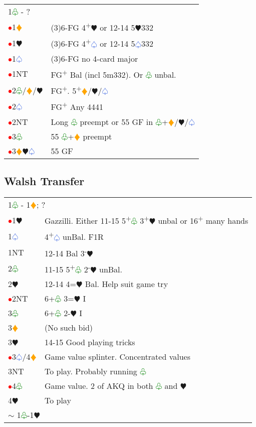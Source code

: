 \documentclass{article}
\renewcommand{\sp}{\textcolor{RoyalBlue}{$\varspade$}}
\newcommand{\he}{\textcolor{RubineRed}{$\varheart$}}
\newcommand{\di}{\textcolor{Orange}{$\vardiamond$}}
\newcommand{\cl}{\textcolor{Green}{$\varclub$}}
\newcommand{\nt}{\relsize{-1}NT\relsize{1}}
\newcommand{\up}{\textsuperscript{+}}
\newcommand{\down}{\textsuperscript{-}}
\newcommand{\al}{\textcolor{red}{$\bullet$}}
\begin{document}
\begin{tabular}{|l|p{6.5cm}}
	\multicolumn{2}{l}{1\cl{} - ? } \\
	\al{}1\di{} & (3)6-FG 4\up\he{} or 12-14 5\he{}332 \\
	\al{}1\he{} & (3)6-FG 4\up\sp{} or 12-14 5\sp{}332 \\
	\al{}1\sp{} & (3)6-FG no 4-card major \\
	\al{}1\nt & FG\up{} Bal (incl 5m332). Or \cl{} unbal. \\
	\al{}2\cl{}/\di{}/\he{} & FG\up{}. 5\up{}\di{}/\he{}/\sp{} \\
	\al{}2\sp{} & FG\up{} Any 4441 \\
	\al{}2\nt & Long \cl{} preempt or 55 GF in \cl{}+\di{}/\he{}/\sp{} \\
	\al{}3\cl{} & 55 \cl{}+\di{} preempt \\
	\al{}3\di{}\he{}\sp{} & 55 GF \\
\end{tabular}

\subsection{Walsh Transfer}
\begin{tabular}{|l|p{6.5cm}}
	\multicolumn{2}{l}{1\cl{} - 1\di{}; ?} \\
	\al{}1\he{} & Gazzilli. Either 11-15 5\up{}\cl{} 3\up{}\he{} unbal or 16\up{} many hands \\
		1\sp{} & 4\up\sp{} unBal. F1R \\
		1\nt & 12-14 Bal 3\down\he{}\\
		2\cl{} & 11-15 5\up\cl{} 2\down{}\he{} unBal.\\
		2\he{} & 12-14 4=\he{} Bal. Help suit game try \\
		\al{}2\nt & 6+\cl{} 3=\he{} I \\
		3\cl{} & 6+\cl{} 2-\he{} I \\
		3\di{} & (No such bid) \\
		3\he{} & 14-15 Good playing tricks \\
		\al{}3\sp{}/4\di{} & Game value splinter. Concentrated values \\
		3\nt{} & To play. Probably running \cl{} \\
		\al{}4\cl{} & Game value. 2 of AKQ in both \cl{} and \he{} \\
		4\he{} & To play \\ 
		\multicolumn{2}{l}{$\sim$ 1\cl{}-1\he{}}
\end{tabular}
\end{document}
